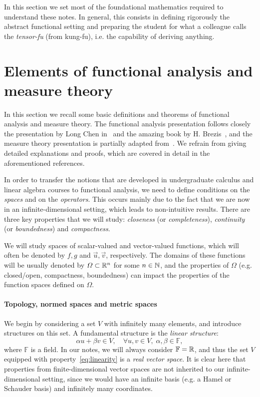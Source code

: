 In this section we set most of the foundational mathematics required to understand these notes. In general, this consists in defining rigorously the abstract functional setting and preparing the student for what a colleague calls the \emph{tensor-fu} (from kung-fu), i.e. the capability of deriving anything.

\section{Elements of functional analysis and measure theory}\label{sec:elements-functional-analysis}
In this section we recall some basic definitions and theorems of functional analysis and measure theory. The functional analysis presentation follows closely the presentation by Long Chen in~\cite{chen2024infSup} and the amazing book by H. Brezis~\cite{BrezisFA}, and the measure theory presentation is partially adapted from~\cite{Tao_2021,Rudin_2013}. We refrain from giving detailed explanations and proofs, which are covered in detail in the aforementioned references.

In order to transfer the notions that are developed in undergraduate calculus and linear algebra courses to functional analysis, we need to define conditions on the \emph{spaces} and on the \emph{operators}. This occurs mainly due to the fact that we are now in an infinite-dimensional setting, which leads to non-intuitive results. There are three key properties that we will study: \emph{closeness} (or \emph{completeness}), \emph{continuity} (or \emph{boundedness}) and \emph{compactness}.

We will study spaces of scalar-valued and vector-valued functions, which will often be denoted by $f, g$ and $\vec u, \vec v$, respectively. The domains of these functions will be usually denoted by $\Omega\subset\mathbb{R}^n$ for some $n\in\mathbb{N}$, and the properties of $\Omega$ (e.g. closed/open, compactness, boundedness) can impact the properties of the function spaces defined on $\Omega$.

\paragraph{Topology, normed spaces and metric spaces}
We begin by considering a set $V$ with infinitely many elements, and introduce structures on this set. A fundamental structure is the \emph{linear structure}:
\begin{equation}\label{eq:linearity}
    \alpha u + \beta v \in V,\quad \forall u,v\in V, \; \alpha, \beta\in \mathbb{F},
\end{equation}
where $\mathbb{F}$ is a field. In our notes, we will always consider $\mathbb{F}=\mathbb{R}$, and thus the set $V$ equipped with property~\eqref{eq:linearity} is a \emph{real vector space}. It is clear here that properties from finite-dimensional vector spaces are not inherited to our infinite-dimensional setting, since we would have an infinite basis (e.g. a Hamel or Schauder basis) and infinitely many coordinates. 


